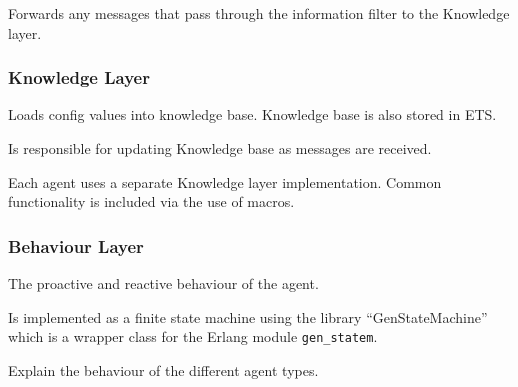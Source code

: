 Forwards any messages that pass through the information filter to the Knowledge layer.

\subsubsection{Knowledge Layer}

Loads config values into knowledge base.
Knowledge base is also stored in ETS\@.

Is responsible for updating Knowledge base as messages are received.

Each agent uses a separate Knowledge layer implementation.
Common functionality is included via the use of macros.

\subsubsection{Behaviour Layer}

The proactive and reactive behaviour of the agent.

Is implemented as a finite state machine using the library ``GenStateMachine'' which is a wrapper class for the Erlang module \verb|gen_statem|.

Explain the behaviour of the different agent types.
